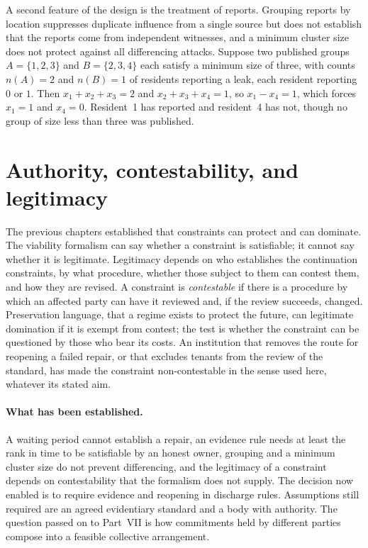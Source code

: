 A second feature of the design is the treatment of reports. Grouping reports by location suppresses duplicate influence from a single source but does not establish that the reports come from independent witnesses, and a minimum cluster size does not protect against all differencing attacks. Suppose two published groups $A=\{1,2,3\}$ and $B=\{2,3,4\}$ each satisfy a minimum size of three, with counts $n(A)=2$ and $n(B)=1$ of residents reporting a leak, each resident reporting $0$ or $1$. Then $x_1+x_2+x_3=2$ and $x_2+x_3+x_4=1$, so $x_1-x_4=1$, which forces $x_1=1$ and $x_4=0$. Resident~1 has reported and resident~4 has not, though no group of size less than three was published.

\section{Authority, contestability, and legitimacy}

The previous chapters established that constraints can protect and can dominate. The viability formalism can say whether a constraint is satisfiable; it cannot say whether it is legitimate. Legitimacy depends on who establishes the continuation constraints, by what procedure, whether those subject to them can contest them, and how they are revised. A constraint is \emph{contestable} if there is a procedure by which an affected party can have it reviewed and, if the review succeeds, changed. Preservation language, that a regime exists to protect the future, can legitimate domination if it is exempt from contest; the test is whether the constraint can be questioned by those who bear its costs. An institution that removes the route for reopening a failed repair, or that excludes tenants from the review of the standard, has made the constraint non-contestable in the sense used here, whatever its stated aim.

\paragraph{What has been established.} A waiting period cannot establish a repair, an evidence rule needs at least the rank in time to be satisfiable by an honest owner, grouping and a minimum cluster size do not prevent differencing, and the legitimacy of a constraint depends on contestability that the formalism does not supply. The decision now enabled is to require evidence and reopening in discharge rules. Assumptions still required are an agreed evidentiary standard and a body with authority. The question passed on to Part~VII is how commitments held by different parties compose into a feasible collective arrangement.

